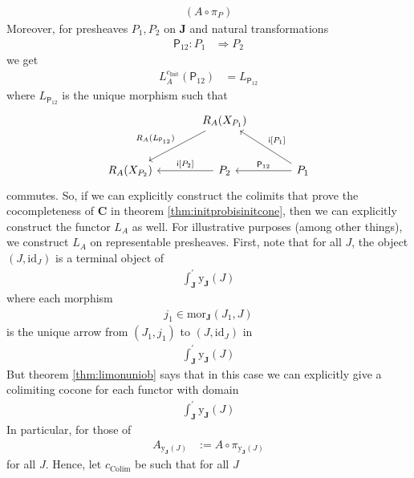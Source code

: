 \begin{cst}
\begin{align*}
  \left(
    A
    \circ
    \pi_{P}
  \right)
\end{align*}
Moreover, for presheaves $P_{1},P_{2}$ on $\mathbf{J}$ and natural transformations
\begin{align*}
  \mathsf{P}_{12}
  \colon
  P_{1}
  &\Rightarrow
  P_{2}
\end{align*}
we get
\begin{align*}
  L_{A}^{c_{\mathrm{Init}}}(\mathsf{P}_{12})
  &=
  L_{\mathsf{P}_{12}}
\end{align*}
where $L_{\mathsf{P}_{12}}$ is the unique morphism such that
\[
\begin{tikzcd}[sep=large]
  &
  R_{A}(X_{P_{1}})
  \arrow[swap]{dl}{R_{A}(L_{\mathsf{P}_{12}})}  
  &
  \\
  R_{A}(X_{P_{2}})
  &
  P_{2}
  \arrow[swap]{l}{\mathsf{i}[P_{2}]}
  &
  P_{1}
  \arrow[swap]{l}{\mathsf{P}_{12}}
  \arrow[swap]{ul}{\mathsf{i}[P_{1}]}
\end{tikzcd}
\]
commutes.
So, if we can explicitly construct the colimits that prove the cocompleteness of $\mathbf{C}$ in theorem \ref{thm:initprobisinitcone}, then we can explicitly construct the functor $L_{A}$ as well.
For illustrative purposes (among other things), we construct $L_{A}$ on representable presheaves.
First, note that for all $J$, the object $(J,\mathrm{id}_{J})$ is a terminal object of
\begin{align*}
  \int_{\mathbf{J}}^{\prime}
  \mathrm{y}_{\mathbf{J}}(J)
\end{align*}
where each morphism
\begin{align*}
  j_{1}
  \in
  \mathrm{mor}_{\mathbf{J}}(J_{1},J)
\end{align*}
is the unique arrow from $(J_{1},j_{1})$ to $(J,\mathrm{id}_{J})$ in
\begin{align*}
  \int_{\mathbf{J}}^{\prime}
  \mathrm{y}_{\mathbf{J}}(J)
\end{align*}
But theorem \ref{thm:limonuniob} says that in this case we can explicitly give a colimiting cocone for each functor with domain
\begin{align*}
  \int_{\mathbf{J}}^{\prime}
  \mathrm{y}_{\mathbf{J}}(J)
\end{align*}
In particular, for those of
\begin{align*}
  A_{\mathrm{y}_{\mathbf{J}}(J)}
  &:=
  A
  \circ
  \pi_{\mathrm{y}_{\mathbf{J}}(J)}
\end{align*}
for all $J$.
Hence, let $c_{\mathrm{Colim}}$ be such that for all $J$
\begin{align*}

\end{align*}
\end{cst}
